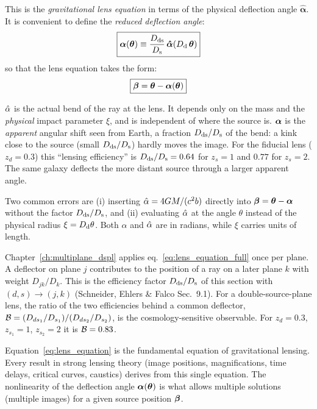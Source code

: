 This is the \emph{gravitational lens equation} in terms of the physical
deflection angle $\boldsymbol{\hat{\alpha}}$.  It is convenient to define
the \emph{reduced deflection angle}:
\begin{equation}
    \boxed{
    \boldsymbol{\alpha}(\boldsymbol{\theta}) \equiv \frac{D_{\mathrm{ds}}}{D_{\mathrm{s}}}\,
    \boldsymbol{\hat{\alpha}}(D_{\mathrm{d}}\,\boldsymbol{\theta})
    }
    \label{eq:reduced_deflection}
\end{equation}
so that the lens equation takes the form:
\begin{equation}
    \boxed{
    \boldsymbol{\beta} = \boldsymbol{\theta} - \boldsymbol{\alpha}(\boldsymbol{\theta})
    }
    \label{eq:lens_equation}
\end{equation}
\begin{annotation}
$\hat{\alpha}$ is the actual bend of the ray at the lens. It depends only on the
mass and the \emph{physical} impact parameter $\xi$, and is independent of
where the source is. $\boldsymbol{\alpha}$ is the \emph{apparent} angular shift
seen from Earth, a fraction $D_{\mathrm{ds}}/D_{\mathrm{s}}$ of the bend: a kink close to the
source (small $D_{\mathrm{ds}}/D_{\mathrm{s}}$) hardly moves the image. For the fiducial lens
($z_d = 0.3$) this ``lensing efficiency'' is $D_{\mathrm{ds}}/D_{\mathrm{s}} = 0.64$ for $z_s = 1$
and $0.77$ for $z_s = 2$. The same galaxy deflects the more distant source
through a larger apparent angle.

Two common errors are (i) inserting $\hat{\alpha} = 4G M/(c^2 b)$
directly into $\boldsymbol{\beta} = \boldsymbol{\theta} - \boldsymbol{\alpha}$ without the factor $D_{\mathrm{ds}}/D_{\mathrm{s}}$,
and (ii) evaluating $\hat{\alpha}$ at the angle $\theta$ instead of the physical
radius $\xi = D_{\mathrm{d}}\theta$. Both $\alpha$ and $\hat{\alpha}$ are in radians,
while $\xi$ carries units of length.
\end{annotation}
\begin{bridge}
Chapter~\ref{ch:multiplane_dspl} applies eq.~\eqref{eq:lens_equation_full}
once per plane. A deflector on plane $j$ contributes to the position of a ray on a
later plane $k$ with weight $D_{jk}/D_k$. This is the efficiency factor
$D_{\mathrm{ds}}/D_{\mathrm{s}}$ of this section with $(d, s) \to (j, k)$
(Schneider, Ehlers \& Falco Sec.~9.1). For a double-source-plane lens, the ratio of the
two efficiencies behind a common deflector,
$\mathcal{B} = (D_{ds_1}/D_{s_1})/(D_{ds_2}/D_{s_2})$, is the cosmology-sensitive
observable. For $z_d = 0.3$, $z_{s_1} = 1$, $z_{s_2} = 2$ it is
$\mathcal{B} = 0.83$.
\end{bridge}

\begin{remark}
Equation~\eqref{eq:lens_equation} is the fundamental equation
of gravitational lensing.  Every result in strong lensing theory
(image positions, magnifications, time delays, critical curves, caustics)
derives from this single equation.  The nonlinearity of the
deflection angle $\boldsymbol{\alpha}(\boldsymbol{\theta})$ is what allows multiple
solutions (multiple images) for a given source position $\boldsymbol{\beta}$.
\end{remark}

